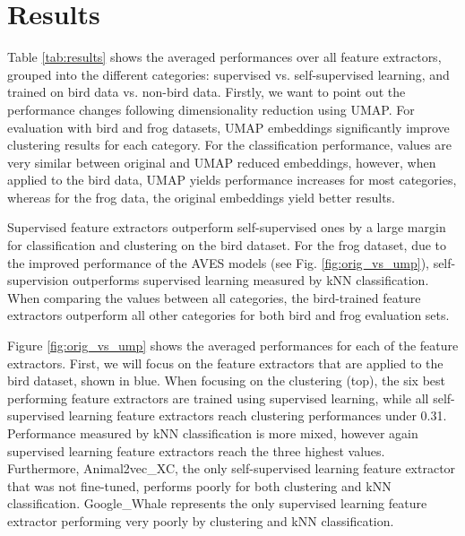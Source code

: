 \section{Results}
\label{sec:results}



Table \ref{tab:results} shows the averaged performances over all feature extractors, grouped into the different categories: supervised vs. self-supervised learning, and trained on bird data vs. non-bird data.
Firstly, we want to point out the performance changes following dimensionality reduction using UMAP.
For evaluation with bird and frog datasets, UMAP embeddings significantly improve clustering results for each category.
For the classification performance, values are very similar between original and UMAP reduced embeddings, however, when applied to the bird data, UMAP yields performance increases for most categories, whereas for the frog data, the original embeddings yield better results.

Supervised feature extractors outperform self-supervised ones by a large margin for classification and clustering on the bird dataset.
For the frog dataset, due to the improved performance of the AVES models (see Fig. \ref{fig:orig_vs_ump}), self-supervision outperforms supervised learning measured by kNN classification.
When comparing the values between all categories, the bird-trained feature extractors outperform all other categories for both bird and frog evaluation sets.




Figure \ref{fig:orig_vs_ump} shows the averaged performances for each of the feature extractors.
First, we will focus on the feature extractors that are applied to the bird dataset, shown in blue.
When focusing on the clustering (top), the six best performing feature extractors are trained using supervised learning, while all self-supervised learning feature extractors reach clustering performances under 0.31.
Performance measured by kNN classification is more mixed, however again supervised learning feature extractors reach the three highest values.
Furthermore, Animal2vec\_XC, the only self-supervised learning feature extractor that was not fine-tuned, performs poorly for both clustering and kNN classification.
Google\_Whale represents the only supervised learning feature extractor performing very poorly by clustering and kNN classification.

